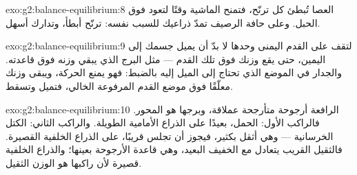 \begin{solution}{exo:g2:balance-equilibrium:8}
العصا تُبطئ كل ترنّح، فتمنح الماشية وقتًا لتعود فوق الحبل. وعلى
حافة الرصيف تمدّ ذراعيك للسبب نفسه: ترنّح أبطأ، وتدارك أسهل.
\end{solution}

\begin{solution}{exo:g2:balance-equilibrium:9}
لتقف على القدم اليمنى وحدها لا بدّ أن يميل جسمك إلى اليمين، حتى
يقع وزنك فوق تلك القدم --- مثل البرج الذي يبقي وزنه فوق قاعدته.
والجدار في الموضع الذي تحتاج إلى الميل إليه بالضبط: فهو يمنع
الحركة، ويبقى وزنك معلّقًا فوق موضع القدم المرفوعة الخالي،
فتميل وتسقط.
\end{solution}

\begin{solution}{exo:g2:balance-equilibrium:10}
الرافعة أرجوحة متأرجحة عملاقة، وبرجها هو المحور. فالراكب الأول:
الحمل، بعيدًا على الذراع الأمامية الطويلة. والراكب الثاني: الكتل
الخرسانية --- وهي أثقل بكثير، فيجوز أن تجلس قريبًا، على الذراع
الخلفية القصيرة. فالثقيل القريب يتعادل مع الخفيف البعيد، وهي
قاعدة الأرجوحة بعينها؛ والذراع الخلفية قصيرة لأن راكبها هو
الوزن الثقيل.
\end{solution}
